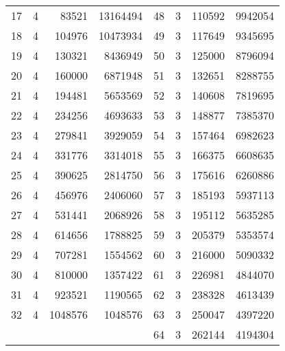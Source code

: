 \documentclass[a4paper,10pt]{article}
\theoremstyle{plain} %
\theoremstyle{definition}
\theoremstyle{remark}
\begin{document}
\begin{center}
\begin{longtable}{r r r r | r r r r}
17 & 4  & 83521   & 13164494 &  48 & 3  & 110592  & 9942054  \\
18 & 4  & 104976  & 10473934 &  49 & 3  & 117649  & 9345695  \\
19 & 4  & 130321  & 8436949  &  50 & 3  & 125000  & 8796094  \\
20 & 4  & 160000  & 6871948  &  51 & 3  & 132651  & 8288755  \\
21 & 4  & 194481  & 5653569  &  52 & 3  & 140608  & 7819695  \\
22 & 4  & 234256  & 4693633  &  53 & 3  & 148877  & 7385370  \\
23 & 4  & 279841  & 3929059  &  54 & 3  & 157464  & 6982623  \\
24 & 4  & 331776  & 3314018  &  55 & 3  & 166375  & 6608635  \\
25 & 4  & 390625  & 2814750  &  56 & 3  & 175616  & 6260886  \\
26 & 4  & 456976  & 2406060  &  57 & 3  & 185193  & 5937113  \\
27 & 4  & 531441  & 2068926  &  58 & 3  & 195112  & 5635285  \\
28 & 4  & 614656  & 1788825  &  59 & 3  & 205379  & 5353574  \\
29 & 4  & 707281  & 1554562  &  60 & 3  & 216000  & 5090332  \\
30 & 4  & 810000  & 1357422  &  61 & 3  & 226981  & 4844070  \\
31 & 4  & 923521  & 1190565  &  62 & 3  & 238328  & 4613439  \\
32 & 4  & 1048576 & 1048576  &  63 & 3  & 250047  & 4397220  \\
   &    &         &          &  64 & 3  & 262144  & 4194304
\end{longtable}
\label{tab:startvalues}
\end{center}
\end{document}
